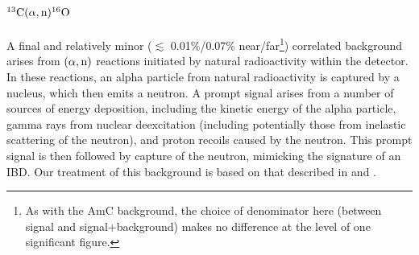 \documentclass[../thesis.tex]{subfiles}
\begin{document}
\begin{table}[ht]
  \caption{AmC background rates for the P17B data set \cite{lianghongBkg}.}
  \label{tab:bkgAmcDailyRates}
\end{table}

\section{$^{13}\mathrm{C}(\alpha, \mathrm{n})^{16}\mathrm{O}$}
\label{sec:bkgCanO}

A final and relatively minor ($\lesssim$ 0.01\%/0.07\% near/far\footnote{As with the AmC background, the choice of denominator here (between signal and signal+background) makes no difference at the level of one significant figure.}) correlated background arises from $(\alpha,\mathrm{n})$ reactions initiated by natural radioactivity within the detector. In these reactions, an alpha particle from natural radioactivity is captured by a nucleus, which then emits a neutron. A prompt signal arises from a number of sources of energy deposition, including the kinetic energy of the alpha particle, gamma rays from nuclear deexcitation (including potentially those from inelastic scattering of the neutron), and proton recoils caused by the neutron. This prompt signal is then followed by capture of the neutron, mimicking the signature of an IBD. Our treatment of this background is based on that described in \cite{Zhao_2014} and \cite{An_2017}.
\end{document}
